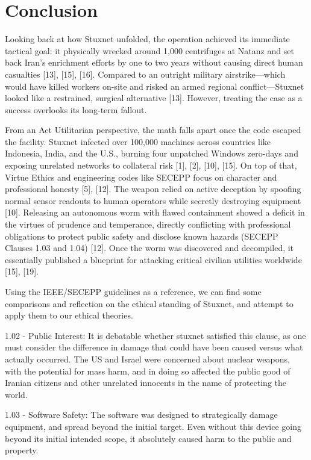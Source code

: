 \section{Conclusion}


Looking back at how Stuxnet unfolded, the operation achieved its immediate tactical goal: it physically wrecked around 1,000 centrifuges at Natanz and set back Iran's enrichment efforts by one to two years without causing direct human casualties [13], [15], [16]. Compared to an outright military airstrike—which would have killed workers on-site and risked an armed regional conflict—Stuxnet looked like a restrained, surgical alternative [13]. However, treating the case as a success overlooks its long-term fallout.

From an Act Utilitarian perspective, the math falls apart once the code escaped the facility. Stuxnet infected over 100,000 machines across countries like Indonesia, India, and the U.S., burning four unpatched Windows zero-days and exposing unrelated networks to collateral risk [1], [2], [10], [15]. On top of that, Virtue Ethics and engineering codes like SECEPP focus on character and professional honesty [5], [12]. The weapon relied on active deception by spoofing normal sensor readouts to human operators while secretly destroying equipment [10]. Releasing an autonomous worm with flawed containment showed a deficit in the virtues of prudence and temperance, directly conflicting with professional obligations to protect public safety and disclose known hazards (SECEPP Clauses 1.03 and 1.04) [12]. Once the worm was discovered and decompiled, it essentially published a blueprint for attacking critical civilian utilities worldwide [15], [19].

Using the IEEE/SECEPP guidelines as a reference, we can find some comparisons and reflection on the ethical standing of Stuxnet, and attempt to apply them to our ethical theories.

1.02 - Public Interest: It is debatable whether stuxnet satisfied this clause, as one must consider the difference in damage that could have been caused versus what actually occurred. The US and Israel were concerned about nuclear weapons, with the potential for mass harm, and in doing so affected the public good of Iranian citizens and other unrelated innocents in the name of protecting the world.

1.03 - Software Safety: The software was designed to strategically damage equipment, and spread beyond the initial target. Even without this device going beyond its initial intended scope, it absolutely caused harm to the public and property.


